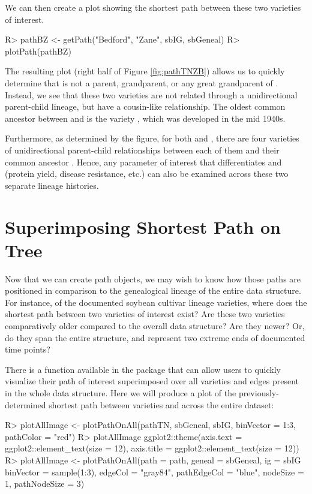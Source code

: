\documentclass[article,shortnames]{jss}
\begin{document}
We can then create a plot showing the shortest path between these two varieties of interest.

\begin{Code}
R> pathBZ <- getPath("Bedford", "Zane", sbIG, sbGeneal)
R> plotPath(pathBZ)
\end{Code}

The resulting plot (right half of Figure \ref{fig:pathTNZB}) allows us to quickly determine that  is not a parent, grandparent, or any great grandparent of . Instead, we see that these two varieties are not related through a unidirectional parent-child lineage, but have a cousin-like relationship. The oldest common ancestor between  and  is the variety , which was developed in the mid 1940s.

Furthermore, as determined by the figure, for both  and , there are four varieties of unidirectional parent-child relationships between each of them and their common ancestor . Hence, any parameter of interest that differentiates  and  (protein yield, disease resistance, etc.) can also be examined across these two separate lineage histories.

\section{Superimposing Shortest Path on Tree}

Now that we can create path objects, we may wish to know how those paths are positioned in comparison to the genealogical lineage of the entire data structure. For instance, of the documented soybean cultivar lineage varieties, where does the shortest path between two varieties of interest exist? Are these two varieties comparatively older compared to the overall data structure? Are they newer? Or, do they span the entire structure, and represent two extreme ends of documented time points?

There is a function available in the  package  that can allow users to quickly visualize their path of interest superimposed over all varieties and edges present in the whole data structure. Here we will produce a plot of the previously-determined shortest path between varieties  and  across the entire dataset:

\begin{Code}
R> plotAllImage <- plotPathOnAll(pathTN, sbGeneal, sbIG, binVector = 1:3,
  pathColor = "red")
R> plotAllImage ggplot2::theme(axis.text = ggplot2::element_text(size = 12), axis.title = ggplot2::element_text(size = 12))
R> plotAllImage <- plotPathOnAll(path = path, geneal = sbGeneal, ig = sbIG
  binVector = sample(1:3), edgeCol = "gray84", pathEdgeCol = "blue", nodeSize
  = 1, pathNodeSize = 3)
\end{Code}
\end{document}
